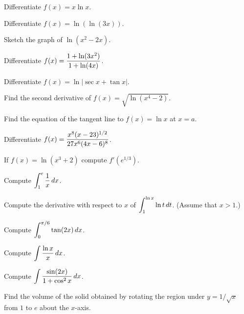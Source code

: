 \exercise Differentiate $f(x) =x\ln x $.
\endexercise

\exercise Differentiate $f(x) =\ln (\ln (3x) )$.
\endexercise

\exercise Sketch the graph of $\ln (x^2 - 2x) $. 
\endexercise

\exercise Differentiate $\displaystyle f(x) ={1+\ln (3x^2 )\over 1+ \ln
(4x)} $. 
\endexercise

\exercise Differentiate $f(x) =\ln |\sec x +\tan x |
$.
\endexercise

\exercise Find the second derivative of $f(x) =\sqrt{\ln (x^4
-2) } $. 
\endexercise

\exercise Find the equation of the tangent line to $f(x) =\ln x
$ at $x=a $. 
\endexercise

\exercise Differentiate $\displaystyle f(x) ={x^8 (x-23)^{1/2}\over 
27 x^6(4x-6)^8 }$.
\endexercise

\exercise If $f(x) = \ln (x^3 + 2 ) $ compute $f'(e^{1/3} )
$.
\endexercise

\exercise Compute
$\displaystyle\int _1 ^e {1\over x}\,dx$.
\endexercise


\exercise Compute the derivative with respect to $x$ of $\displaystyle\int _1 ^{\ln
  x} \ln t\, dt $. (Assume that $x>1$.)
\endexercise

\exercise Compute
$\displaystyle\int _0 ^{\pi/6} \tan (2x)\, dx$.
\endexercise


\exercise Compute $\displaystyle\int {\ln x\over x}\,dx$.
\endexercise


\exercise Compute $\displaystyle\int {\sin (2x)\over 1+\cos ^2 x }\,dx$.
\endexercise


\exercise Find the volume of the solid obtained by rotating the
region under $y=1/\sqrt{x}$ from $1$ to $e$ about the
$x$-axis.
\endexercise

\endexercises
